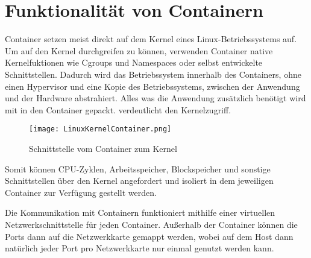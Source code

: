 \section{Funktionalität von Containern}
\label{sec:Funktionalität von Container}

Container setzen meist direkt auf dem Kernel eines Linux-Betriebssystems auf. Um auf den Kernel durchgreifen zu können, verwenden Container native Kernelfuktionen wie Cgroups und Namespaces oder selbst entwickelte Schnittstellen. Dadurch wird das Betriebssystem innerhalb des Containers, ohne einen Hypervisor und eine Kopie des Betriebssystems, zwischen der Anwendung und der Hardware abstrahiert. Alles was die Anwendung zusätzlich benötigt wird mit in den Container gepackt. \citep{10228802020150501}  verdeutlicht den Kernelzugriff.

\begin{figure}[H]
	\begin{center}
		\texttt{[image: LinuxKernelContainer.png]}
	\end{center}
	\caption[Beispielhafte Schnittstellen vom Container zum Kernel]{Schnittstelle vom Container zum Kernel \footnotemark}
	\label{fig:linuxkernelcontainer}
\end{figure}
Somit können CPU-Zyklen, Arbeitsspeicher, Blockspeicher und sonstige Schnittstellen über den Kernel angefordert und isoliert in dem jeweiligen Container zur Verfügung gestellt werden. \citep{12059254020170101}

Die Kommunikation mit Containern funktioniert mithilfe einer virtuellen Netzwerkschnittstelle für jeden Container. Außerhalb der Container können die Ports dann auf die Netzwerkkarte gemappt werden, wobei auf dem Host dann natürlich jeder Port pro Netzwerkkarte nur einmal genutzt werden kann. \citep{10228802020150501}

